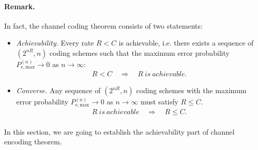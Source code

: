 \documentclass{article}
\numberwithin{equation}{section}
\theoremstyle{plain}
\theoremstyle{definition}
\begin{document}
\paragraph{Remark.} In fact, the channel coding theorem consists of two statements:
\begin{itemize}
	\item\textit{Achievability.} Every rate $R<C$ is achievable, i.e. there exists a sequence of $(2^{nR},n)$ coding schemes such that the maximum error probability $P_{\mathrm{e,max}}^{(n)}\to 0$ as $n\to\infty$:
	\begin{align*}
		R<C\quad\Rightarrow\quad R\ is\ achievable.
	\end{align*}
	\item\textit{Converse.} Any sequence of $(2^{nR},n)$ coding schemes with the maximum error probability $P_{\mathrm{e,max}}^{(n)}\to 0$ as $n\to\infty$ must satisfy $R\leq C$.
	\begin{align*}
		R\ is\ achievable\quad\Rightarrow\quad R\leq C.
	\end{align*}
\end{itemize}

\paragraph{} In this section, we are going to establish the achievability part of channel encoding theorem.
\end{document}
